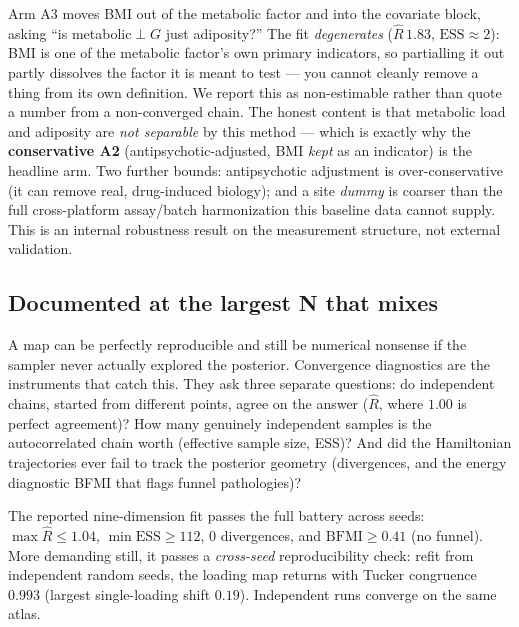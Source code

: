 \begin{caveatbox}
Arm A3 moves BMI out of the metabolic factor and into the covariate block, asking ``is metabolic$\perp$$G$ just
adiposity?'' The fit \emph{degenerates} ($\widehat{R}\,1.83$, $\mathrm{ESS}\approx2$): BMI is one of the metabolic
factor's own primary indicators, so partialling it out partly dissolves the factor it is meant to test --- you
cannot cleanly remove a thing from its own definition. We report this as non-estimable rather than quote a number
from a non-converged chain. The honest content is that metabolic load and adiposity are \emph{not separable} by
this method --- which is exactly why the \textbf{conservative A2} (antipsychotic-adjusted, BMI \emph{kept} as an
indicator) is the headline arm. Two further bounds: antipsychotic adjustment is over-conservative (it can remove
real, drug-induced biology); and a site \emph{dummy} is coarser than the full cross-platform assay/batch
harmonization this baseline data cannot supply. This is an internal robustness result on the measurement
structure, not external validation.
\end{caveatbox}

\subsection{Documented at the largest N that mixes}
\label{sub:cert}
A map can be perfectly reproducible and still be numerical nonsense if the sampler never actually
explored the posterior. Convergence diagnostics are the instruments that catch this. They ask three separate
questions: do independent chains, started from different points, agree on the answer ($\widehat{R}$, where
$1.00$ is perfect agreement)? How many genuinely independent samples is the autocorrelated chain worth
(effective sample size, ESS)? And did the Hamiltonian trajectories ever fail to track the posterior geometry
(divergences, and the energy diagnostic BFMI that flags funnel pathologies)?

The reported nine-dimension fit passes the full battery across seeds: $\max\widehat{R}\le 1.04$,
$\min\mathrm{ESS}\ge 112$, $0$ divergences, and $\mathrm{BFMI}\ge 0.41$ (no funnel). More demanding still, it
passes a \emph{cross-seed} reproducibility check: refit from independent random seeds, the loading map returns
with Tucker congruence $0.993$ (largest single-loading shift $0.19$). Independent runs converge on the same
atlas.

